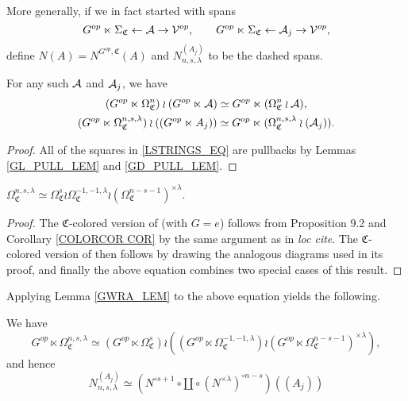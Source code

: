 \documentclass[a4paper,10pt
,draft
]{article}%
\renewcommand{\1}{\eta}%
\newcommand{\SC}{\Sigma_{\mathfrak C}}
\newcommand{\OC}{\Omega_{\mathfrak C}}
\begin{document}
\begin{definition}
      More generally, if we in fact started with spans
      \begin{equation}
            G^{op} \ltimes \SC \leftarrow \A \to \V^{op},
            \qquad
            G^{op} \ltimes \SC \leftarrow \A_j \to \V^{op},
      \end{equation}
      define $N(A) = N^{G^{op},\mathfrak C}(A)$ and $N_{n,s,\lambda}^{(A_j)}$ to be the dashed spans.
\end{definition}


\begin{lemma}
      \label{GWRA_LEM}
      For any such $\mathcal{A}$ and $\mathcal{A}_j$, we have
      \begin{gather*}
            (G^{op} \ltimes \OC^{n}) \wr (G^{op} \ltimes \A) \simeq G^{op} \ltimes (\OC^{n} \wr \A),
            \\
            (G^{op} \ltimes \OC^{n,s,\lambda}) \wr ((G^{op} \ltimes A_j)) \simeq G^{op} \ltimes (\OC^{n,s,\lambda} \wr (\A_j)).
      \end{gather*}
\end{lemma}
\begin{proof}
      All of the squares in \eqref{LSTRINGS_EQ} are pullbacks by Lemmas \ref{GL_PULL_LEM} and \ref{GD_PULL_LEM}.
\end{proof}


\begin{lemma}
      $\OC^{n,s,\lambda} \simeq \OC^s \wr \OC^{-1,-1,\lambda} \wr (\OC^{n-s-1})^{\times \lambda}$.
\end{lemma}
\begin{proof}
      The $\mathfrak C$-colored version of \cite[Prop 5.30]{BP_geo} (with $G = e$)
      follows from Proposition 9.2 and Corollary \ref{COLORCOR COR}
      by the same argument as in \textit{loc cite}.
      The $\mathfrak C$-colored version of \cite[Cor. 5.32]{BP_geo} then follows by drawing the analogous diagrams used in its proof,
      and finally the above equation combines two special cases of this result.
\end{proof}


Applying Lemma \ref{GWRA_LEM} to the above equation yields the following.
\begin{proposition}
      \label{NNSL_PROP}
      We have
      \begin{equation}
            G^{op} \ltimes \OC^{n,s,\lambda} \simeq
            (G^{op} \ltimes \OC^{s}) \wr ((G^{op} \ltimes \OC^{-1,-1,\lambda}) \wr (G^{op} \ltimes \OC^{n-s-1})^{\times \lambda}),
      \end{equation}
      and hence
      \begin{equation}
            N_{n,s,\lambda}^{(A_j)}
            \simeq
            \left(
                  N^{\circ s + 1} \circ \amalg \circ (N^{\times \lambda})^{\circ n-s}
            \right)
            ((A_j))
      \end{equation}
\end{proposition}
\end{document}

